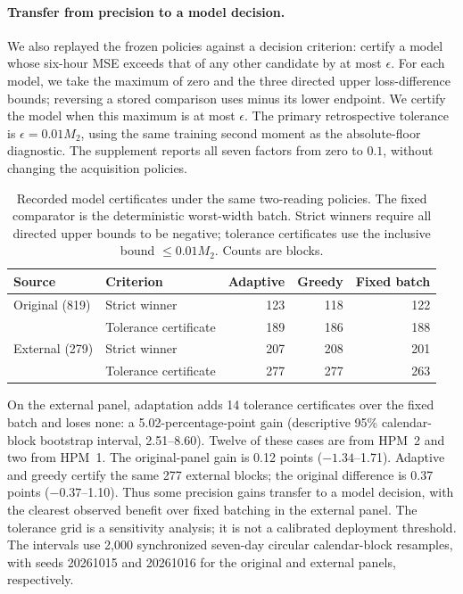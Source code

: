 \paragraph{Transfer from precision to a model decision.}
We also replayed the frozen policies against a decision criterion: certify
a model whose six-hour MSE exceeds that of any other candidate by at most
$\epsilon$. For each model, we take the maximum of zero and the three directed
upper loss-difference bounds; reversing a stored comparison uses minus its
lower endpoint. We certify the model when this maximum is at most $\epsilon$.
The primary retrospective tolerance is $\epsilon=0.01M_2$, using the same
training second moment as the absolute-floor diagnostic. The supplement
reports all seven factors from zero to $0.1$, without changing the acquisition
policies.
\begin{table}[ht]
\centering
\caption{Recorded model certificates under the same two-reading policies.
The fixed comparator is the deterministic worst-width batch.
Strict winners require all directed upper bounds to be negative; tolerance
certificates use the inclusive bound $\leq0.01M_2$. Counts are blocks.}
\label{tab:decision-tolerance}
\begin{tabular}{llrrr}
\toprule
Source & Criterion & Adaptive & Greedy & Fixed batch\\
\midrule
Original (819) & Strict winner & 123 & 118 & 122\\
 & Tolerance certificate & 189 & 186 & 188\\
External (279) & Strict winner & 207 & 208 & 201\\
 & Tolerance certificate & 277 & 277 & 263\\
\bottomrule
\end{tabular}
\end{table}
On the external panel, adaptation adds 14 tolerance certificates over the
fixed batch and loses none: a 5.02-percentage-point gain (descriptive 95\%
calendar-block bootstrap interval, 2.51--8.60). Twelve of these cases are from
HPM~2 and two from HPM~1. The original-panel gain is 0.12 points
($-1.34$--1.71). Adaptive and greedy certify the same 277 external blocks;
the original difference is 0.37 points ($-0.37$--1.10).
Thus some precision gains transfer to a model decision, with the clearest
observed benefit over fixed batching in the external panel. The tolerance
grid is a sensitivity analysis; it is not a calibrated deployment threshold.
The intervals use 2,000 synchronized seven-day circular calendar-block
resamples, with seeds 20261015 and 20261016 for the original and external
panels, respectively.
